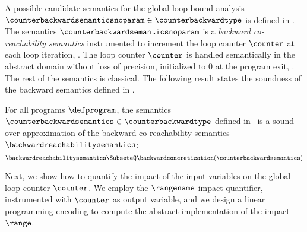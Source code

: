A possible candidate semantics for the global loop bound analysis $\counterbackwardsemanticsnoparam\in\counterbackwardtype$ is defined in .
The semantics $\counterbackwardsemanticsnoparam$ is a \textit{backward co-reachability semantics} instrumented to increment the loop counter $\counter$ at each loop iteration, \cf{} .
The loop counter $\counter$ is handled semantically in the abstract domain without loss of precision, initialized to $0$ at the program exit, \cf{} .
The rest of the semantics is classical.
The following result states the soundness of the backward semantics defined in .
%

\begin{lemma}
  For all programs $\defprogram$, the semantics $\counterbackwardsemantics\in\counterbackwardtype$ defined in~ is a \textup{sound over-approximation} of the backward co-reachability semantics $\backwardreachabilitysemantics$:
  \begin{equation*}
    \backwardreachabilitysemantics \SubseteQ \backwardconcretization(\counterbackwardsemantics)
  \end{equation*}
\end{lemma}

Next, we show how to quantify the impact of the input variables on the global loop counter $\counter$.
We employ the $\rangename$ impact quantifier, instrumented with $\counter$ as output variable, and we design a linear programming encoding to compute the abstract implementation of the impact $\range$.

